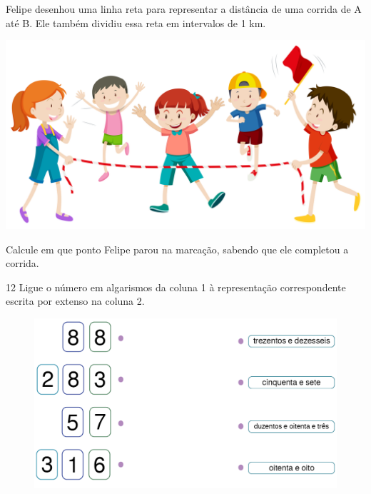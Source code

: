 \vspace{1em}

Felipe desenhou uma linha reta para representar a distância de uma corrida de A até B. Ele também dividiu essa reta em intervalos de 1 km. 

\includegraphics[width=\textwidth]{./media/image6a.jpeg}

\begin{escolha}
\item Calcule em que ponto Felipe parou na marcação, sabendo que ele completou a corrida.\\
\end{escolha}

\num{12} Ligue o número em algarismos da coluna 1 
à representação correspondente escrita por extenso na coluna 2.

\begin{figure}[htpb!]
\centering
\includegraphics[width=\textwidth]{./media/image5.png}
\end{figure}


